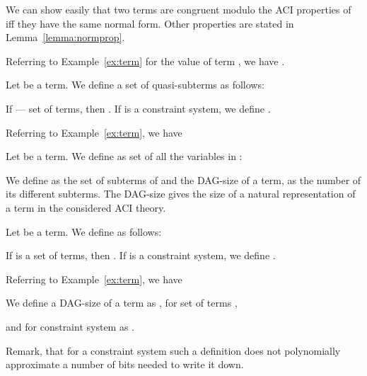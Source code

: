 We can show easily that two terms  are congruent modulo the ACI properties of  iff they have the same normal form. 
Other properties are stated in Lemma~\ref{lemma:normprop}. 


\begin{example}
 Referring to Example~\ref{ex:term} for the value of term , we have
.
\end{example}






\begin{df}
 Let  be a term. We define a set of quasi-subterms  as follows:

If  --- set of terms, then . 
If  is a constraint system, we define .
\end{df}

\begin{example}
 Referring to Example~\ref{ex:term}, we have

\end{example}




\begin{df}\label{df:vars}
 Let  be a term. We define  as set of all the variables in :

\end{df}










We define  as the set of subterms of  
and the  DAG-size of a term, as the number of its different subterms. 
The DAG-size gives the size of a natural representation of a term in the 
considered ACI theory. 

\begin{df}\label{df:subdag}
 Let  be a term. We define  as follows:

If  is a set of terms, then .
If  is a constraint system, we define .
\end{df}

\begin{example}
 Referring to Example~\ref{ex:term}, we have

\end{example}



\begin{df}\label{df:sizedag}
    We define a DAG-size  of a term  as
,
for set of terms ,

and for constraint system  as
.
\end{df}
Remark, that for a constraint system such a definition does not polynomially approximate a number of bits needed to write it down.









